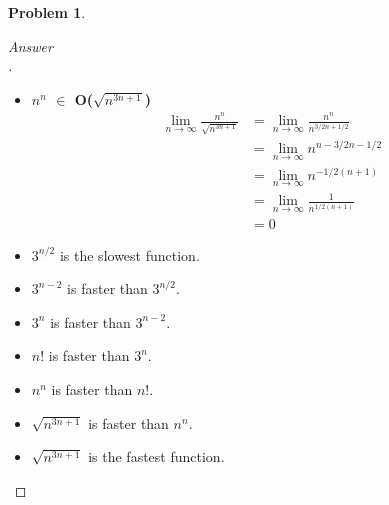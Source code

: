 \documentclass[11pt]{article}
\theoremstyle{definition}
\theoremstyle{definition}
\newtheorem{required}{Problem}
\theoremstyle{definition}
\begin{document}
\begin{required}
\begin{enumerate}[label=(\alph*)]
\begin{proof}[Answer\\]
\begin{itemize}
\item \textbf{ $n^n$ $\in$ O($\sqrt{n^{3n+1}}$)}
\begin{align*}
\lim_{n \to \infty} \frac {n^n}{\sqrt{n^{3n+1}}} &= \lim_{n \to \infty} \frac {n^n}{n^{3/2n+1/2}}\\
&= \lim_{n \to \infty}  n^{n-3/2n-1/2}\\
&= \lim_{n \to \infty}  n^{-1/2(n+1)}\\
&= \lim_{n \to \infty}  \frac{1}{n^{1/2(n+1)}}\\
&= 0
\end{align*}
\item $3^{n/2}$ is the slowest function.
\item $3^{n-2}$ is faster than $3^{n/2}$.
\item $3^n$ is faster than $3^{n-2}$.
\item $n!$ is faster than $3^n$.
\item $n^n$ is faster than $n!$.
\item $\sqrt{n^{3n+1}}$ is faster than $n^n$.
\item $\sqrt{n^{3n+1}}$ is the fastest function.
\end{itemize}
\end{proof}
\end{enumerate}

\end{required}



\newpage
\end{document}
